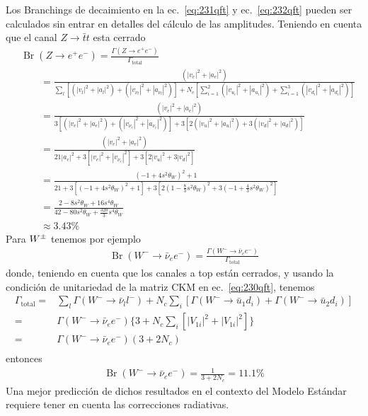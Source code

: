 Los Branchings de decaimiento en la ec.~\eqref{eq:231qft} y ec.~\eqref{eq:232qft}  pueden ser calculados sin entrar en detalles del cálculo de las amplitudes. Teniendo en cuenta que el canal $Z\to\bar{t}t$ esta cerrado
\begin{align}
  &\operatorname{Br}(Z\to e^+e^-)=\frac{\Gamma(Z\to e^+e^-)}{\Gamma_{\text{total}}}\nonumber\\
 &\qquad=\frac{(|v_e|^2+|a_e|^2)}{\sum_l[(|v_l|^2+|a_l|^2)+(|v_{\nu_l}|^2+|a_{\nu_l}|^2)]
+N_c[\sum_{i=1}^2(|v_{u_i}|^2+|a_{u_i}|^2)+\sum_{i=1}^3(|v_{d_i}|^2+|a_{d_i}|^2)]}\nonumber\\
 &\qquad=\frac{(|v_e|^2+|a_e|^2)}{3[(|v_e|^2+|a_e|^2)+(|v_{\nu_e}|^2+|a_{\nu_e}|^2)]
+3[2(|v_{u}|^2+|a_{u}|^2)+3(|v_{d}|^2+|a_{d}|^2)]}\nonumber\\
  &\qquad=\frac{(|v_e|^2+|a_e|^2)}{21|a_e|^2+3[|v_e|^2+|v_{\nu_e}|^2]
+3[2|v_{u}|^2+3|v_{d}|^2]}\nonumber\\
 &\qquad=\frac{(-1+4s^2\theta_W)^2+1}{21+3[(-1+4s^2\theta_W)^2+1]
+3[2(1-\frac{8}{3}s^2\theta_W)^2+3(-1+\frac{4}{3}s^2\theta_W)^2]}\nonumber\\
  &\qquad=\frac{2-8s^2\theta_W+16s^4\theta_W}{42-80s^2\theta_W+\frac{320}{3}s^4\theta_W}\nonumber\\
&\qquad\approx3.43\%
\end{align}
Para $W^\pm$ tenemos por ejemplo
\begin{align}
\operatorname{Br}(W^-\to\bar{\nu}_e e^-)=\frac{\Gamma(W^-\to\bar{\nu}_e e^-)}{\Gamma_{\text{total}}}
\end{align}
donde, teniendo en cuenta que los canales a top están cerrados, y usando la condición de unitariedad de la matriz CKM en ec.~\eqref{eq:230qft}, tenemos
\begin{align}
  \Gamma_{\text{total}}=&\sum_l\Gamma(W^-\to\bar{\nu}_l l^-)+N_c\sum_i[\Gamma(W^-\to\bar{u}_1d_i)+\Gamma(W^-\to\bar{u}_2d_i)]\nonumber\\
  =&\Gamma(W^-\to\bar{\nu}_e e^-)\{3+N_c\sum_i[|V_{1i}|^2+|V_{1i}|^2]\} \nonumber\\
  =&\Gamma(W^-\to\bar{\nu}_e e^-)(3+2N_c) \nonumber\\
\end{align}
entonces
\begin{align}
  \operatorname{Br}(W^-\to\bar{\nu}_e e^-)=\frac{1}{3+2N_c}=11.1\%
\end{align}
Una mejor predicción de dichos resultados en el contexto del Modelo Estándar requiere tener en cuenta las correcciones radiativas.

